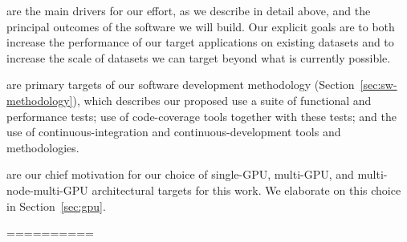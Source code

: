 \begin{description}
  \item[Scalability and performance] are the main drivers for our effort, as we describe in detail above, and the principal outcomes of the software we will build. Our explicit goals are to both increase the performance of our target applications on existing datasets and to increase the scale of datasets we can target beyond what is currently possible.

  \item[Correctness and accuracy] are primary targets of our software development methodology (Section~\ref{sec:sw-methodology}), which describes our proposed use a suite of functional and performance tests; use of code-coverage tools together with these tests; and the use of continuous-integration and continuous-development tools and methodologies.

  \item[The capabilities of heterogeneous architectures] are our chief motivation for our choice of single-GPU, multi-GPU, and multi-node-multi-GPU architectural targets for this work. We elaborate on this choice in Section~\ref{sec:gpu}.


\end{description}











\iffalse
==========



